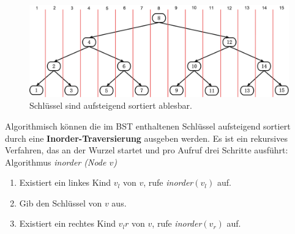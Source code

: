 \documentclass[a4paper,12pt]{article}
\begin{document}
\begin{figure}[H]
	\centering
	\includegraphics[width= 1\textwidth]{Medien/Einleitung/linksRechts}
	\caption{Schlüssel sind aufsteigend sortiert ablesbar. }
	\label{fig:linksRechts}
\end{figure}
\noindent Algorithmisch können die im BST enthaltenen Schlüssel aufsteigend sortiert durch eine \textbf{Inorder-Traversierung} ausgeben werden. Es ist ein rekursives Verfahren, das an der Wurzel startet und pro Aufruf drei Schritte ausführt:\\

Algorithmus \textit{inorder (Node $v$)}
\begin{enumerate}
	\item Existiert ein linkes Kind $v_l$ von $v$, rufe \textit{inorder}$\left(v_l\right)$ auf. 
	\item Gib den Schlüssel von $v$ aus. 
	\item Existiert ein rechtes Kind $v_lr$ von $v$, rufe  \textit{inorder}$\left(v_r\right)$  auf. 
\end{enumerate}
\end{document}

